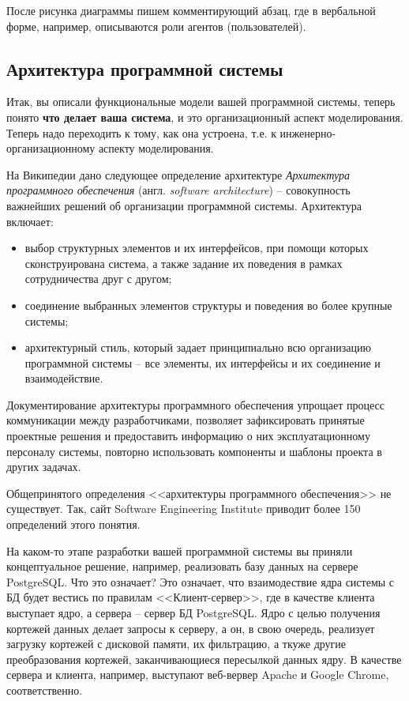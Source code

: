 \documentclass[a4paper,14pt,final]{extreport}
\begin{document}
После рисунка диаграммы пишем комментирующий абзац, где в вербальной форме, например, описываются роли агентов (пользователей).

\subsection{Архитектура программной системы}
\label{sec:architecture}

Итак, вы описали функциональные модели вашей программной системы, теперь понято \textbf{что делает ваша система}, и это организационный аспект моделирования.  Теперь надо переходить к тому, как она устроена, т.е. к инженерно-организационному аспекту моделирования.

На Википедии дано следующее определение архитектуре \cite{wiki:architecture} %
\emph{Архитектура программного обеспечения} (англ. \emph{software architecture}) -- совокупность важнейших решений об организации программной системы.  Архитектура включает:
\begin{itemize}
\item выбор структурных элементов и их интерфейсов, при помощи которых сконструирована система, а также задание их поведения в рамках сотрудничества друг с другом;
\item соединение выбранных элементов структуры и поведения во более крупные системы;
\item архитектурный стиль, который задает принципиально всю организацию программной системы -- все элементы, их интерфейсы и их соединение и взаимодействие.
\end{itemize}
Документирование архитектуры программного обеспечения упрощает процесс коммуникации между разработчиками, позволяет зафиксировать принятые проектные решения и предоставить информацию о них эксплуатационному персоналу системы, повторно использовать компоненты и шаблоны проекта в других задачах.

Общепринятого определения <<архитектуры программного обеспечения>> не существует.  Так, сайт Software Engineering Institute приводит более 150 определений этого понятия.

На каком-то этапе разработки вашей программной системы вы приняли концептуальное решение, например, реализовать базу данных на сервере PostgreSQL.  Что это означает?  Это означает, что взаимодествие ядра системы с БД будет вестись по правилам <<Клиент-сервер>>, где в качестве клиента выступает ядро, а сервера -- сервер БД PostgreSQL.  Ядро с целью получения кортежей данных делает запросы к серверу, а он, в свою очередь, реализует загрузку кортежей с дисковой памяти, их фильтрацию, а ткуже другие преобразования кортежей, заканчивающиеся пересылкой данных ядру.  В качестве сервера и клиента, например, выступают веб-вервер Apache и Google Chrome, соответственно.
\end{document}
